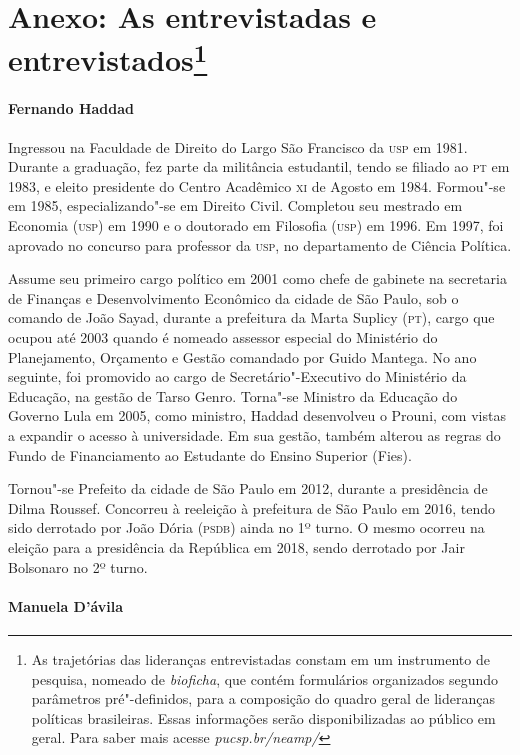 \section{Anexo: As entrevistadas e entrevistados\protect\footnote{As
  trajetórias das lideranças entrevistadas constam em um instrumento de
  pesquisa, nomeado de \emph{bioficha}, que contém formulários
  organizados segundo parâmetros pré"-definidos, para a composição do
  quadro geral de lideranças políticas brasileiras. Essas informações
  serão disponibilizadas ao público em geral. Para saber mais acesse
  \emph{pucsp.br/neamp/}}}

\paragraph{Fernando Haddad}

Ingressou na Faculdade de Direito do Largo São Francisco da \textsc{usp} em 1981.
Durante a graduação, fez parte da militância estudantil, tendo se
filiado ao \textsc{pt} em 1983, e eleito presidente do Centro Acadêmico \textsc{xi} de
Agosto em 1984. Formou"-se em 1985, especializando"-se em Direito Civil.
Completou seu mestrado em Economia (\textsc{usp}) em 1990 e o doutorado em
Filosofia (\textsc{usp}) em 1996. Em 1997, foi aprovado no concurso para
professor da \textsc{usp}, no departamento de Ciência Política.

Assume seu primeiro cargo político em 2001 como chefe de gabinete na
secretaria de Finanças e Desenvolvimento Econômico da cidade de São
Paulo, sob o comando de João Sayad, durante a prefeitura da Marta
Suplicy (\textsc{pt}), cargo que ocupou até 2003 quando é nomeado assessor
especial do Ministério do Planejamento, Orçamento e Gestão comandado por
Guido Mantega. No ano seguinte, foi promovido ao cargo de
Secretário"-Executivo do Ministério da Educação, na gestão de Tarso
Genro. Torna"-se Ministro da Educação do Governo Lula em 2005, como
ministro, Haddad desenvolveu o Prouni, com vistas a expandir o acesso à
universidade. Em sua gestão, também alterou as regras do Fundo de
Financiamento ao Estudante do Ensino Superior (Fies).

Tornou"-se Prefeito da cidade de São Paulo em 2012, durante a presidência
de Dilma Roussef. Concorreu à reeleição à prefeitura de São Paulo em
2016, tendo sido derrotado por João Dória (\textsc{psdb}) ainda no 1º turno. O
mesmo ocorreu na eleição para a presidência da República em 2018, sendo
derrotado por Jair Bolsonaro no 2º turno.

\paragraph{Manuela D'ávila}

